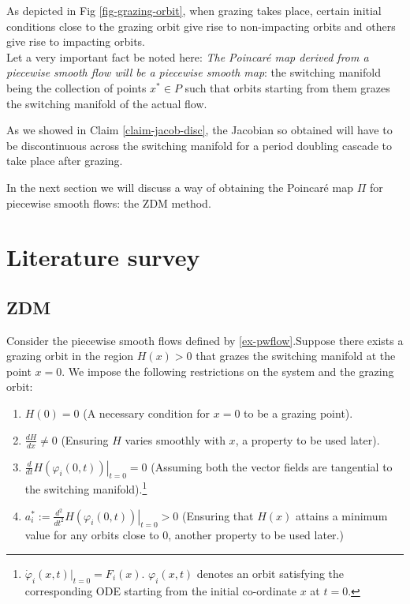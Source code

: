 \documentclass[oneside]{book}
\renewcommand{\(}{\begin{columns}}
\renewcommand{\)}{\end{columns}}
\newcommand{\<}[1]{\begin{column}{#1}}
\renewcommand{\>}{\end{column}}
\begin{document}
As depicted in Fig \ref{fig-grazing-orbit}, when grazing takes place, certain 
initial conditions close to the grazing orbit give rise to non-impacting 
orbits and others give rise to impacting orbits.  \\


Let a very important fact be noted here: \emph{The Poincaré map derived from a 
piecewise smooth flow  
will be a piecewise smooth map}: the switching manifold being the collection of points 
$x^*\in P$ such that orbits starting from them grazes the switching manifold 
of the actual flow.  

As we showed in Claim \ref{claim-jacob-disc}, the Jacobian so obtained will 
have to be discontinuous across the switching manifold for a period doubling 
cascade to take place after grazing.  


In the next section we will discuss a way of obtaining the Poincaré map 
$\Pi$ for piecewise smooth flows: the ZDM method.  

\section{Literature survey}
\subsection{ZDM}
\label{prop-ZDM}
Consider the piecewise smooth flows defined by \eqref{ex-pwflow}.Suppose 
there exists a grazing orbit in the region $H(x)>0$ that grazes the switching 
manifold at the point $x=0$.  We impose the following restrictions on the 
system and the grazing orbit:

\begin{enumerate}
\item $H(0)=0$ (A necessary condition for $x=0$ to be a grazing point).
\item $\frac{dH}{dx}\neq 0$ (Ensuring $H$ varies smoothly with $x$, a property 
to be used later).
\item $\frac{d}{dt}\left.  H(\varphi_i(0,t))\right|_{t=0}=0$ (Assuming both 
the vector fields are tangential to the switching manifold).\footnote{
$\dot{\varphi}_i(x,t)|_{t=0}=F_i(x)$.  $\varphi_i(x,t)$ denotes an orbit 
satisfying the corresponding ODE starting from the initial co-ordinate 
$x$ at $t=0$.  }
\item $a_i^*:=\frac{d^2}{dt^2}\left.  H(\varphi_i(0,t))\right|_{t=0}>0$ 
(Ensuring that $H(x)$ attains a minimum value for any orbits close to $0$, 
another property to be used later.)\label{crit-minH}
\end{enumerate}
\end{document}

